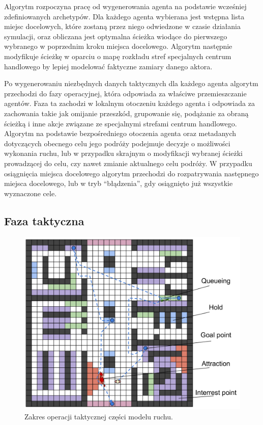 \documentclass[a4paper, 12pt]{article}
\begin{document}

Algorytm rozpoczyna pracę od wygenerowania agenta na podstawie wcześniej zdefiniowanych archetypów.
Dla każdego agenta wybierana jest wstępna lista miejsc docelowych, które zostaną przez niego odwiedzone w czasie działania symulacji, oraz obliczana jest optymalna ścieżka wiodące do pierwszego wybranego w poprzednim kroku miejsca docelowego. Algorytm następnie modyfikuje ścieżkę w oparciu o mapę rozkładu stref specjalnych centrum handlowego by lepiej modelować faktyczne zamiary danego aktora.

Po wygenerowaniu niezbędnych danych taktycznych dla każdego agenta algorytm przechodzi do fazy operacyjnej, która odpowiada za właściwe przemieszczanie agentów. Faza ta zachodzi w lokalnym otoczeniu każdego agenta i odpowiada za zachowania takie jak omijanie przeszkód, grupowanie się, podążanie za obraną ścieżką i inne akcje związane ze specjalnymi strefami centrum handlowego.
Algorytm na podstawie bezpośredniego otoczenia agenta oraz metadanych dotyczących obecnego celu jego podróży podejmuje decyzje o możliwości wykonania ruchu, lub w przypadku skrajnym o modyfikacji wybranej ścieżki prowadzącej do celu, czy nawet zmianie aktualnego celu podróży.
W przypadku osiągnięcia miejsca docelowego algorytm przechodzi do rozpatrywania następnego miejsca docelowego, lub w tryb ``błądzenia'', gdy osiągnięto już wszystkie wyznaczone cele.

\newpage
        \subsection{Faza taktyczna}
        \label{sec:tactical}

        \begin{figure}[H]
            \centering
            \includegraphics[scale=0.3]{./img/Tactical.pdf}
            \caption{Zakres operacji taktycznej części modelu ruchu.}
            \label{fig:tactical}
        \end{figure}
\end{document}
